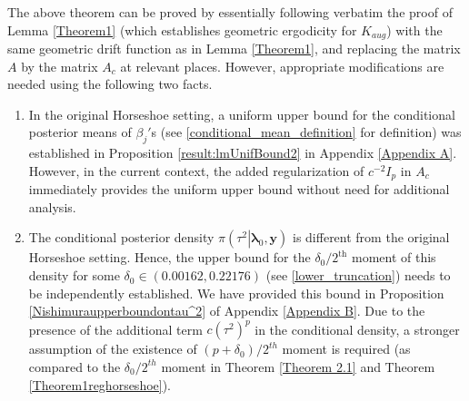 \documentclass[noinfoline,11pt]{imsart}
\numberwithin{equation}{section}
\theoremstyle{plain}
\newcommand{\y}{\mathbf{y}}
\newcommand{\bl}{\boldsymbol{\lambda}}
\begin{document}
\noindent
The above theorem can be proved by essentially following verbatim the proof 
of Lemma \ref{Theorem1}  (which establishes geometric ergodicity for 
$K_{aug}$) with the same geometric drift function as in 
Lemma \ref{Theorem1}, and replacing the matrix $A$ by the matrix $A_c$ at 
relevant places. However, appropriate modifications are needed using the following two facts.  \begin{enumerate}
    \item In the original Horseshoe setting, a uniform upper bound for the conditional posterior means of $\beta_j'$s (see  \eqref{conditional_mean_definition} for definition) was established in Proposition \ref{result:lmUnifBound2} in Appendix \ref{Appendix A}. However, in the current context, the added regularization of $c^{-2} I_p$ in $A_c$ immediately provides the uniform upper bound without need for additional analysis. 
    \item The conditional posterior density $\pi\left(\left.\tau^2\right|\bl_0,\y\right)$ is different from the original Horseshoe setting. Hence, the upper bound for the $\delta_0/2^{\text{th}}$ moment of this density for some $\delta_0 \in (0.00162,0.22176)$ (see \eqref{lower_truncation}) needs to be independently established. We have provided this bound in Proposition \ref{Nishimuraupperboundontau^2} of Appendix \ref{Appendix B}. Due to the presence of the additional term $c(\tau^2)^p$ in the conditional density, a stronger assumption of the existence of $(p+\delta_0)/2^{th}$
    moment is required (as compared to the $\delta_0/2^{th}$ moment in 
    Theorem \ref{Theorem 2.1} and Theorem \ref{Theorem1reghorseshoe}). 
\end{enumerate}
\end{document}
